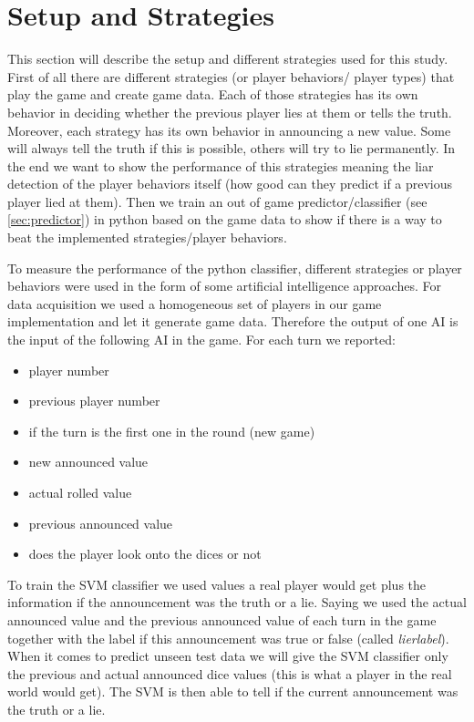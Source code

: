 \documentclass[11pt]{article}
\begin{document}
\section{Setup and Strategies}
\label{sec:setstrat}
This section will describe the setup and different strategies used for this study.
First of all there are different strategies (or player behaviors/ player types) that play the game and create game data. 
Each of those strategies has its own behavior in deciding whether the previous player lies at them or tells the truth. 
Moreover, each strategy has its own behavior in announcing a new value. 
Some will always tell the truth if this is possible, others will try to lie permanently. 
In the end we want to show the performance of this strategies meaning the liar detection of the player behaviors itself (how good can they predict if a previous player lied at them). 
Then we train an out of game predictor/classifier (see \cref{sec:predictor}) in python based on the game data to show if there is a way to beat the implemented strategies/player behaviors.

To measure the performance of the python classifier, different strategies or player behaviors were used in the form of some artificial intelligence approaches.
For data acquisition we used a homogeneous set of players in our game implementation and let it generate game data. 
Therefore the output of one AI is the input of the following AI in the game.
For each turn we reported:
\begin{itemize}
	\item player number
	\item previous player number
	\item if the turn is the first one in the round (new game)
	\item new announced value
	\item actual rolled value
	\item previous announced value
	\item does the player look onto the dices or not
\end{itemize}
To train the SVM classifier we used values a real player would get plus the information if the announcement was the truth or a lie. 
Saying we used the actual announced value and the previous announced value of each turn in the game together with the label if this announcement was true or false (called \emph{lierlabel}).
When it comes to predict unseen test data we will give the SVM classifier only the previous and actual announced dice values (this is what a player in the real world would get). 
The SVM is then able to tell if the current announcement was the truth or a lie.
\end{document}
